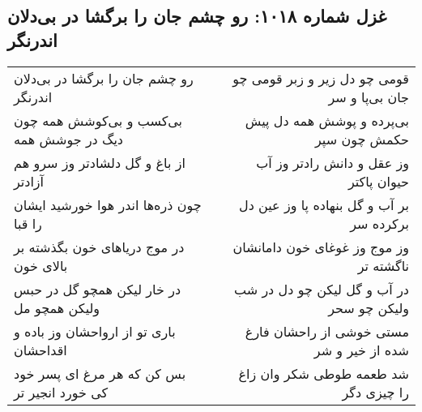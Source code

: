 \begin{center}
\section*{غزل شماره ۱۰۱۸: رو چشم جان را برگشا در بی‌دلان اندرنگر}
\label{sec:1018}
\begin{longtable}{l p{0.5cm} r}
رو چشم جان را برگشا در بی‌دلان اندرنگر
&&
قومی چو دل زیر و زبر قومی چو جان بی‌پا و سر
\\
بی‌کسب و بی‌کوشش همه چون دیگ در جوشش همه
&&
بی‌پرده و پوشش همه دل پیش حکمش چون سپر
\\
از باغ و گل دلشادتر وز سرو هم آزادتر
&&
وز عقل و دانش رادتر وز آب حیوان پاکتر
\\
چون ذره‌ها اندر هوا خورشید ایشان را قبا
&&
بر آب و گل بنهاده پا وز عین دل برکرده سر
\\
در موج دریاهای خون بگذشته بر بالای خون
&&
وز موج وز غوغای خون دامانشان ناگشته تر
\\
در خار لیکن همچو گل در حبس ولیکن همچو مل
&&
در آب و گل لیکن چو دل در شب ولیکن چو سحر
\\
باری تو از ارواحشان وز باده و اقداحشان
&&
مستی خوشی از راحشان فارغ شده از خیر و شر
\\
بس کن که هر مرغ ای پسر خود کی خورد انجیر تر
&&
شد طعمه طوطی شکر وان زاغ را چیزی دگر
\\
\end{longtable}
\end{center}
